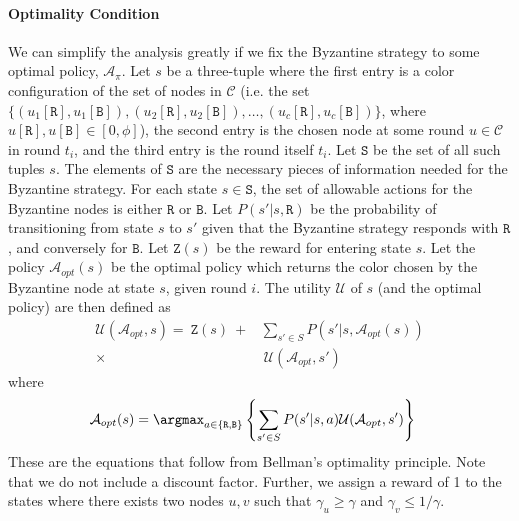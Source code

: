 \paragraph{Optimality Condition}
We can simplify the analysis greatly if we fix the Byzantine strategy to some optimal policy, $\mathcal{A}_{\pi}$. 
Let $s$ be a three-tuple where the first entry is a color configuration of the set of nodes in $\mathcal{C}$ (i.e. the set $\lbrace(u_1[\mathtt{R}], u_1[\mathtt{B}]), (u_2[\mathtt{R}], u_2[\mathtt{B}]), \dots, (u_c[\mathtt{R}], u_c[\mathtt{B}])\rbrace$, where $u[\mathtt{R}], u[\mathtt{B}] \in [0, \phi]$), the second entry is the chosen node at some round $u \in \mathcal{C}$ in round $t_i$, and the third entry is the round itself $t_i$. Let $\mathtt{S}$ be the set of all such tuples $s$. The elements of $\mathtt{S}$ are the necessary pieces of information needed for the Byzantine strategy. 
For each state $s \in \mathtt{S}$, the set of allowable actions for the Byzantine nodes is either $\mathtt{R}$ or $\mathtt{B}$. Let $P(s' | s, {\mathtt{R}})$ be the probability of transitioning from state $s$ to $s'$ given that the Byzantine strategy responds with $\mathtt{R}$, and conversely for $\mathtt{B}$. Let $\mathtt{Z}(s)$ be the reward for entering state $s$. Let the policy $\mathcal{A}_{opt}(s)$ be the optimal policy which returns the color chosen by the Byzantine node at state $s$, given round $i$. 
The utility $\mathcal{U}$ of $s$ (and the optimal policy) are then defined as
\begin{equation}
\begin{split}
\mathcal{U}(\mathcal{A}_{opt}, s) =\ \mathtt{Z}(s)\ +& \sum_{s' \in S} P(s' | s, \mathcal{A}_{opt}(s))\\
\times &\ \mathcal{U}(\mathcal{A}_{opt}, s')
\end{split}
\end{equation}
where 
\begin{equation}
\begin{split}
    \mathcal{A}_{opt}(s) &= \argmax_{a \in \lbrace \mathtt{R}, \mathtt{B} \rbrace} \left \lbrace \sum_{s' \in S}P(s'|s, a)\mathcal{U}(\mathcal{A}_{opt}, s') \right \rbrace
\end{split}
\end{equation}
These are the equations that follow from Bellman's optimality principle. Note that we do not include a discount factor. Further, we assign a reward of 1 to the states where there exists two nodes $u, v$ such that $\gamma_u \geq \gamma$ and $\gamma_v \leq 1/\gamma$. 


